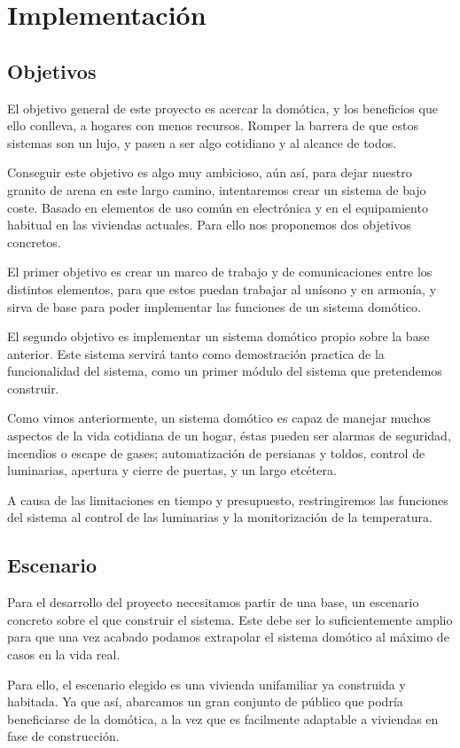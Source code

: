 \chapter{Implementación}
 \section{Objetivos}
 El objetivo general de este proyecto es acercar la domótica, y los beneficios que ello conlleva, a hogares con menos recursos. Romper la barrera de que estos sistemas son un lujo, y pasen a ser algo cotidiano y al alcance de todos.
 
  Conseguir este objetivo es algo muy ambicioso, aún así, para dejar nuestro granito de arena en este largo camino, 
  intentaremos crear un sistema de bajo coste. Basado en elementos de uso común en  electrónica y en el equipamiento habitual en las viviendas actuales.  Para ello nos proponemos dos objetivos concretos.
  
  El primer objetivo es crear un marco de trabajo y de comunicaciones entre los distintos elementos, para que estos puedan trabajar al unísono y en armonía, y sirva de base para poder implementar las funciones de un sistema domótico.
  
  El segundo objetivo es implementar  un sistema domótico propio sobre la base anterior. Este sistema servirá tanto como demostración practica de la funcionalidad del sistema, como un primer módulo del sistema que pretendemos construir.
  
  Como vimos anteriormente, un sistema domótico es capaz de manejar muchos aspectos de la vida cotidiana de un hogar, éstas pueden ser alarmas de seguridad, incendios o escape de gases; automatización de persianas y toldos, control de luminarias, apertura y cierre de puertas, y un largo etcétera. 
  
  A causa de las limitaciones en tiempo y presupuesto, restringiremos las funciones del sistema al control de las luminarias y la monitorización de la temperatura.

\section{Escenario}
Para el desarrollo del proyecto necesitamos partir de una base, un escenario concreto sobre el que construir el sistema. Este debe ser lo suficientemente amplio para que una vez acabado podamos extrapolar el sistema domótico al máximo de casos en la vida real.

Para ello, el escenario elegido es una vivienda unifamiliar ya construida y habitada. Ya que así, abarcamos  un gran conjunto de público que podría beneficiarse de la domótica, a la vez que es facilmente adaptable a viviendas en fase de construcción.


